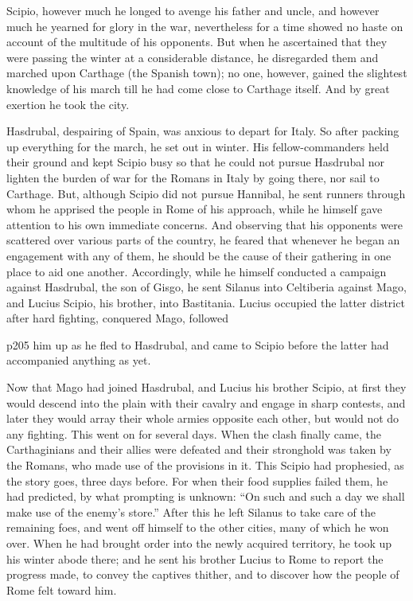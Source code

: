 Scipio, however much he longed to avenge his father and uncle, and however much he yearned for glory in the war, nevertheless for a time showed no haste on account of the multitude of his opponents. But when he ascertained that they were passing the winter at a considerable distance, he disregarded them and marched upon Carthage (the Spanish town); no one, however, gained the slightest knowledge of his march till he had come close to Carthage itself. And by great exertion he took the city.

Hasdrubal, despairing of Spain, was anxious to depart for Italy. So after packing up everything for the march, he set out in winter. His fellow-commanders held their ground and kept Scipio busy so that he could not pursue Hasdrubal nor lighten the burden of war for the Romans in Italy by going there, nor sail to Carthage. But, although Scipio did not pursue Hannibal, he sent runners through whom he apprised the people in Rome of his approach, while he himself gave attention to his own immediate concerns. And observing that his opponents were scattered over various parts of the country, he feared that whenever he began an engagement with any of them, he should be the cause of their gathering in one place to aid one another. Accordingly, while he himself conducted a campaign against Hasdrubal, the son of Gisgo, he sent Silanus into Celtiberia against Mago, and Lucius Scipio, his brother, into Bastitania. Lucius occupied the latter district after hard fighting, conquered Mago, followed

p205 him up as he fled to Hasdrubal, and came to Scipio before the latter had accompanied anything as yet.

Now that Mago had joined Hasdrubal, and Lucius his brother Scipio, at first they would descend into the plain with their cavalry and engage in sharp contests, and later they would array their whole armies opposite each other, but would not do any fighting. This went on for several days. When the clash finally came, the Carthaginians and their allies were defeated and their stronghold was taken by the Romans, who made use of the provisions in it. This Scipio had prophesied, as the story goes, three days before. For when their food supplies failed them, he had predicted, by what prompting is unknown: ``On such and such a day we shall make use of the enemy's store.'' After this he left Silanus to take care of the remaining foes, and went off himself to the other cities, many of which he won over. When he had brought order into the newly acquired territory, he took up his winter abode there; and he sent his brother Lucius to Rome to report the progress made, to convey the captives thither, and to discover how the people of Rome felt toward him.

